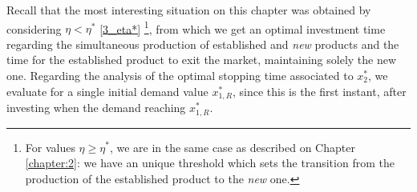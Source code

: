 Recall that the most interesting situation on this chapter was obtained by considering $\eta<\eta^*$ \eqref{3_eta*} \footnote{For values $\eta \geq \eta^*$, we are in the same case as described on Chapter \ref{chapter:2}: we have an unique threshold which sets the transition from the production of the established product to the \textit{new} one.}, from which we get an optimal investment time regarding the simultaneous production of established and \textit{new} products and the time for the established product to exit the market, maintaining solely the new one. Regarding the analysis of the optimal stopping time associated to $x_2^*$, we evaluate for a single initial demand value $x_{1,R}^*$, since this is the first instant, after investing when the demand reaching $x_{1,R}^*$.





		



